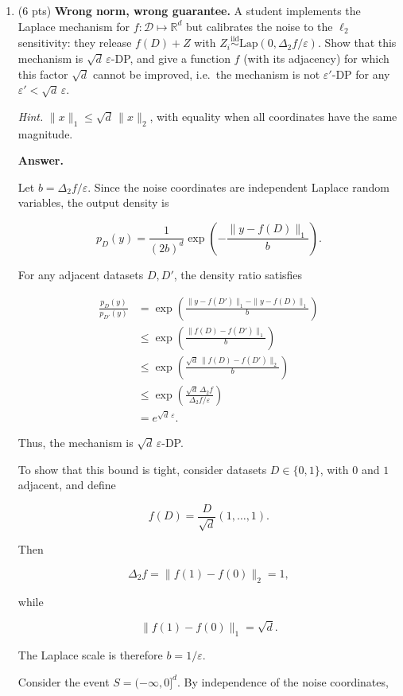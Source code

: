\documentclass[11pt]{article}
\newcommand{\cD}{\mathcal{D}}
\newcommand{\R}{\mathbb{R}}
\newcommand{\Lap}{\mathrm{Lap}}
\newcommand{\eps}{\varepsilon}
\newenvironment{answer}{\par\medskip\noindent\textbf{Answer.}\ }{\par\bigskip}
\begin{document}
\begin{enumerate}

\item (6 pts) \textbf{Wrong norm, wrong guarantee.} A student implements the
Laplace mechanism for $f:\cD\mapsto\R^d$ but calibrates the noise to the
$\ell_2$ sensitivity: they release $f(D)+Z$ with
$Z_i\overset{\text{iid}}{\sim}\Lap(0,\Delta_2 f/\eps)$. Show that this
mechanism is $\sqrt{d}\,\eps$-DP, and give a function $f$ (with its adjacency)
for which this factor $\sqrt{d}$ cannot be improved, i.e.\ the mechanism is
not $\eps'$-DP for any $\eps'<\sqrt{d}\,\eps$.

\textit{Hint.} $\|x\|_1\le\sqrt{d}\,\|x\|_2$, with equality when all
coordinates have the same magnitude.

\begin{answer}

Let $b=\Delta_2 f/\eps$. Since the noise
coordinates are independent Laplace random
variables, the output density is

\[
p_D(y)=\frac{1}{(2b)^d}
\exp\left(-\frac{\|y-f(D)\|_1}{b}\right).
\]

For any adjacent datasets $D,D'$, the
density ratio satisfies

\[
\begin{aligned}
\frac{p_D(y)}{p_{D'}(y)}
&=\exp\left(
\frac{\|y-f(D')\|_1-\|y-f(D)\|_1}{b}
\right)\\
&\le \exp\left(
\frac{\|f(D)-f(D')\|_1}{b}
\right)\\
&\le \exp\left(
\frac{\sqrt d\,\|f(D)-f(D')\|_2}{b}
\right)\\
&\le \exp\left(
\frac{\sqrt d\,\Delta_2 f}{\Delta_2 f/\eps}
\right)\\
&=e^{\sqrt d\,\eps}.
\end{aligned}
\]

Thus, the mechanism is $\sqrt d\,\eps$-DP.

To show that this bound is tight, consider
datasets $D\in\{0,1\}$, with $0$ and $1$
adjacent, and define

\[
f(D)=\frac{D}{\sqrt d}(1,\ldots,1).
\]

Then

\[
\Delta_2 f=\|f(1)-f(0)\|_2=1,
\]

while

\[
\|f(1)-f(0)\|_1=\sqrt d.
\]

The Laplace scale is therefore $b=1/\eps$.

Consider the event $S=(-\infty,0]^d$.
By independence of the noise coordinates,


\end{answer}
\end{enumerate}
\end{document}
